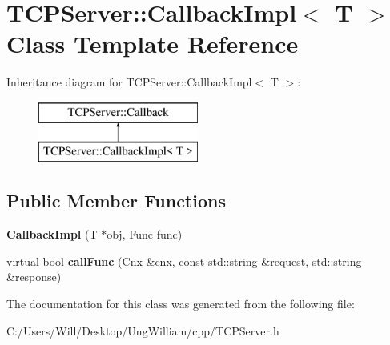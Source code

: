 \hypertarget{class_t_c_p_server_1_1_callback_impl}{}\section{T\+C\+P\+Server\+:\+:Callback\+Impl$<$ T $>$ Class Template Reference}
\label{class_t_c_p_server_1_1_callback_impl}
Inheritance diagram for T\+C\+P\+Server\+:\+:Callback\+Impl$<$ T $>$\+:\begin{figure}[H]
\begin{center}
\leavevmode
\includegraphics[height=2.000000cm]{class_t_c_p_server_1_1_callback_impl}
\end{center}
\end{figure}
\subsection*{Public Member Functions}
\begin{DoxyCompactItemize}
\item 
{\bfseries Callback\+Impl} (T $\ast$obj, Func func)\hypertarget{class_t_c_p_server_1_1_callback_impl_a39abe4ac0e2782d2ec0504a01fcdeb1e}{}\label{class_t_c_p_server_1_1_callback_impl_a39abe4ac0e2782d2ec0504a01fcdeb1e}

\item 
virtual bool {\bfseries call\+Func} (\hyperlink{class_t_c_p_server_1_1_cnx}{Cnx} \&cnx, const std\+::string \&request, std\+::string \&response)\hypertarget{class_t_c_p_server_1_1_callback_impl_a7370ad2f2dc50df8f623480f1991381b}{}\label{class_t_c_p_server_1_1_callback_impl_a7370ad2f2dc50df8f623480f1991381b}

\end{DoxyCompactItemize}


The documentation for this class was generated from the following file\+:\begin{DoxyCompactItemize}
\item 
C\+:/\+Users/\+Will/\+Desktop/\+Ung\+William/cpp/T\+C\+P\+Server.\+h\end{DoxyCompactItemize}
